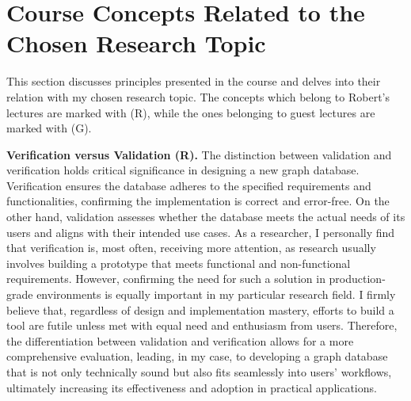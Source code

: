 \documentclass[a4paper, 11pt]{article}
\begin{document}
\section{Course Concepts Related to the Chosen Research Topic}
This section discusses principles presented in the course and delves into their relation with my chosen research topic. The concepts which belong to Robert's lectures are marked with (R), while the ones belonging to guest lectures are marked with (G). 

\noindent\textbf{Verification versus Validation (R).} 
The distinction between validation and verification holds critical significance in designing a new graph database. Verification ensures the database adheres to the specified requirements and functionalities, confirming the implementation is correct and error-free. On the other hand, validation assesses whether the database meets the actual needs of its users and aligns with their intended use cases. As a researcher, I personally find that verification is, most often, receiving more attention, as research usually involves building a prototype that meets functional and non-functional requirements. However, confirming the need for such a solution in production-grade environments is equally important in my particular research field. I firmly believe that, regardless of design and implementation mastery, efforts to build a tool are futile unless met with equal need and enthusiasm from users. Therefore, the differentiation between validation and verification allows for a more comprehensive evaluation, leading, in my case, to developing a graph database that is not only technically sound but also fits seamlessly into users' workflows, ultimately increasing its effectiveness and adoption in practical applications.
\end{document}
